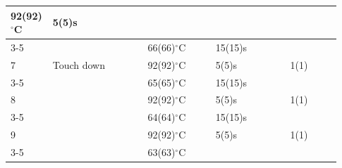 \documentclass[UTF8,10pt,a4paper,fontset=fandol]{ctexart}
\newcommand{\fieldvalue}[1]{#1}
\newcommand{\handwritten}[1]{#1}
\begin{document}
\begin{tabular}{|p{0.08\linewidth}|p{0.28\linewidth}|p{0.20\linewidth}|p{0.22\linewidth}|p{0.15\linewidth}|}
\fieldvalue{\handwritten{92}}(92)$^\circ$C &
\fieldvalue{\handwritten{5}}(5)s &
\\
\cline{3-5}
 & &
\fieldvalue{\handwritten{66}}(66)$^\circ$C &
\fieldvalue{\handwritten{15}}(15)s &
\\
\hline
7 & Touch down &
\fieldvalue{\handwritten{92}}(92)$^\circ$C &
\fieldvalue{\handwritten{5}}(5)s &
\fieldvalue{\handwritten{1}}(1) \\
\cline{3-5}
 & &
\fieldvalue{\handwritten{65}}(65)$^\circ$C &
\fieldvalue{\handwritten{15}}(15)s &
\\
\hline
8 & &
\fieldvalue{\handwritten{92}}(92)$^\circ$C &
\fieldvalue{\handwritten{5}}(5)s &
\fieldvalue{\handwritten{1}}(1) \\
\cline{3-5}
 & &
\fieldvalue{\handwritten{64}}(64)$^\circ$C &
\fieldvalue{\handwritten{15}}(15)s &
\\
\hline
9 & &
\fieldvalue{\handwritten{92}}(92)$^\circ$C &
\fieldvalue{\handwritten{5}}(5)s &
\fieldvalue{\handwritten{1}}(1) \\
\cline{3-5}
 & &
\fieldvalue{\handwritten{63}}(63)$^\circ$C &

\end{tabular}
\end{document}
